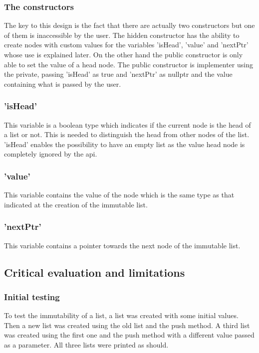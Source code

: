 \documentclass[a4paper, 12pt]{report}
\begin{document}
\subsubsection{The constructors}
The key to this design is the fact that there are actually two constructors but one of them is inaccessible by the user. The hidden constructor has the ability to create nodes with custom values for the variables 'isHead', 'value' and 'nextPtr' whose use is explained later. On the other hand the public constructor is only able to set the value of a head node. The public constructor is implementer using the private, passing 'isHead' as true and 'nextPtr' as nullptr and the value containing what is passed by the user.

\subsubsection{'isHead'}
This variable is a boolean type which indicates if the current node is the head of a list or not. This is needed to distinguish the head from other nodes of the list.  'isHead' enables the possibility to have an empty list as the value head node is completely ignored by the api.

\subsubsection{'value'}
This variable contains the value of the node which is the same type as that indicated at the creation of the immutable list.

\subsubsection{'nextPtr'}
This variable contains a pointer towards the next node of the immutable list.

\subsection{Critical evaluation and limitations}
\subsubsection{Initial testing}
To test the immutability of a list, a list was created with some initial values. Then a new list was created using the old list and the push method. A third list was created using the first one and the push method with a different value passed as a parameter. All three lists were printed as should.
\end{document}

